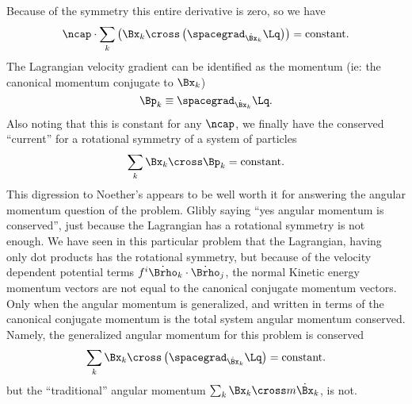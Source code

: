 {\begin{equation}
\end{equation}
%
Because of the symmetry this entire derivative is zero, so we have
%
\begin{equation}\label{eqn:goldsteinCh12:560}
\ncap \cdot \sum_{k} \left(\Bx_k \cross \left( \spacegrad_{\dot{\Bx}_k} \Lq \right) \right) = \text{constant}.
\end{equation}
%
The Lagrangian velocity gradient can be identified as the momentum
(ie: the canonical momentum conjugate to \(\Bx_k\))
%
\begin{equation}\label{eqn:goldsteinCh12:580}
\Bp_k \equiv \spacegrad_{\dot{\Bx}_k} \Lq.
\end{equation}
%
Also noting that this is constant for any \(\ncap\), we finally have the
conserved ``current'' for a rotational symmetry of a system of particles
%
\begin{equation}\label{eqn:goldsteinCh12:600}
\sum_{k} \Bx_k \cross \Bp_k = \text{constant}.
\end{equation}
%
This digression to Noether's appears to be well worth it for answering the angular momentum question of the problem.  Glibly saying ``yes
angular momentum is conserved'', just because the Lagrangian has a rotational symmetry is not enough.  We have seen in this particular
problem that the Lagrangian, having only dot products has the rotational symmetry, but because of the velocity dependent
potential terms \(f^i \dot{\Brho}_k \cdot \dot{\Brho}_j\), the normal Kinetic energy momentum vectors are not equal to the canonical conjugate
momentum vectors.  Only when the angular momentum is generalized, and written in terms of the canonical conjugate momentum is the total
system angular momentum conserved.  Namely, the generalized angular momentum for this problem is conserved
%
\begin{equation}\label{eqn:goldsteinCh12:620}
\sum_{k} \Bx_k \cross \left( \spacegrad_{\dot{\Bx}_k} \Lq \right) = \text{constant}.
\end{equation}
%
but the ``traditional'' angular momentum \(\sum_k \Bx_k \cross m \dot{\Bx}_k\), is not.
}
%

